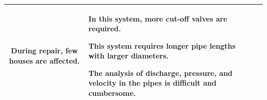 \documentclass{article}
\begin{document}
\begin{table}[h!]
\begin{tabular}{  c m{4cm} | m{3.1cm} |  m{3.1cm} |}
\begin{itemize}[leftmargin=*]
{        \item During repair, few houses are affected.}
      \end{itemize}
      \vspace{-1em} 
    & 
       \begin{itemize}[leftmargin=*]
      \scriptsize{
        \item In this system, more cut-off valves are required.
        \item This system requires longer pipe lengths with larger diameters.
        \item The analysis of discharge, pressure, and velocity in the pipes is difficult and cumbersome.}
      \end{itemize}
    \\ \hline
   \end{tabular}
\end{table}
\vspace{-2em} 
\restoregeometry
\end{document}
